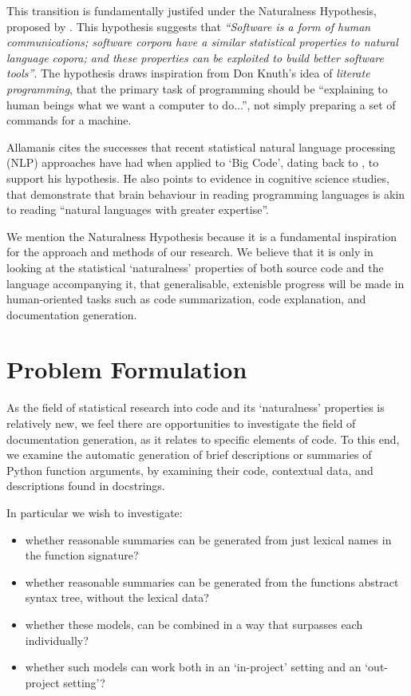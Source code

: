 This transition is fundamentally justifed under the Naturalness Hypothesis, proposed by \citet{allamanis_survey_2017}. 
This hypothesis suggests that \textit{``Software is a form of human communications; software corpora have a similar statistical properties to natural language copora; and these properties can be exploited to build better software tools''}.\citep{allamanis_survey_2017} 
The hypothesis draws inspiration from Don Knuth's idea of \textit{literate programming}\citep{knuth_literate_1984}, that the primary task of programming should be ``explaining to human beings what we want a computer to do...''\citep{knuth_literate_1984}, not simply preparing a set of commands for a machine.

Allamanis cites the successes that recent statistical natural language processing (NLP) approaches have had when applied to `Big Code', dating back to \citet{Hindle:2012:NS:2337223.2337322}, to support his hypothesis. He also points to evidence in cognitive science studies, that demonstrate that brain behaviour in reading programming languages is akin to reading ``natural languages with greater expertise''\citep{floyd_decoding_2017}.

We mention the Naturalness Hypothesis because it is a fundamental inspiration for the approach and methods of our research.
We believe that it is only in looking at the statistical `naturalness' properties of both source code and the language accompanying it, that generalisable, extenisble progress will be made in human-oriented tasks such as code summarization, code explanation, and documentation generation.


\section{Problem Formulation} %
\label{sec:problem_formulation}

As the field of statistical research into code and its `naturalness' properties is relatively new, we feel there are opportunities to investigate the field of documentation generation, as it relates to specific elements of code. 
To this end, we examine the automatic generation of brief descriptions or summaries of Python function arguments, by examining their code, contextual data, and descriptions found in docstrings.

In particular we wish to investigate:
\begin{itemize}
    \item whether reasonable summaries can be generated from just lexical names in the function signature?
    \item whether reasonable summaries can be generated from the functions abstract syntax tree, without the lexical data?
    \item whether these models, can be combined in a way that surpasses each individually?
    \item whether such models can work both in an `in-project' setting and an `out-project setting'?
\end{itemize}
 

